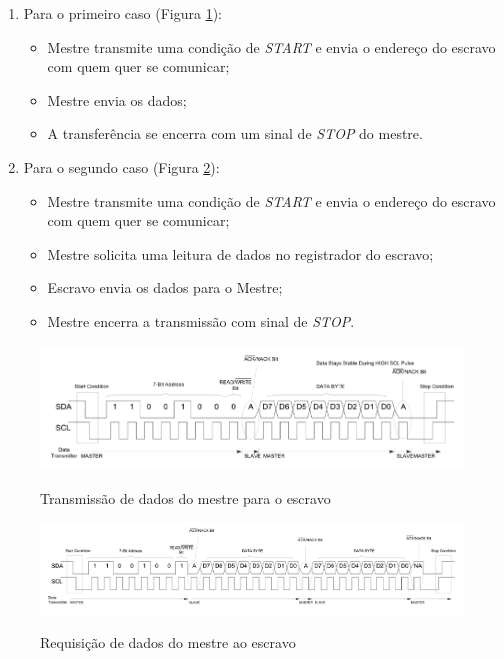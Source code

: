 \begin{enumerate}
\item Para o primeiro caso (Figura \ref{fig:i2cwrite}):
\begin{itemize}
	\item Mestre transmite uma condição de \textit{START} e envia o endereço do escravo com quem quer se comunicar;
	\item Mestre envia os dados;
	\item A transferência se encerra com um sinal de \textit{STOP} do mestre.
\end{itemize}

\item Para o segundo caso  (Figura \ref{fig:i2cread}):
\begin{itemize}
	\item Mestre transmite uma condição de \textit{START} e envia o endereço do escravo com quem quer se comunicar;
	\item Mestre solicita uma leitura de dados no registrador do escravo;
	\item Escravo envia os dados para o Mestre;
	\item Mestre encerra a transmissão com sinal de \textit{STOP}.
\end{itemize}
\end{enumerate}

\begin{figure}[!htb]
	\centering
	\caption{Transmissão de dados do mestre para o escravo}
	\includegraphics[width=1\linewidth]{figuras/i2cwrite}
	\label{fig:i2cwrite}
\end{figure}

\begin{figure}[!htb]
	\centering
	\caption{Requisição de dados do mestre ao escravo}
	\includegraphics[width=1\linewidth]{figuras/i2cread}
	\label{fig:i2cread}
\end{figure}


